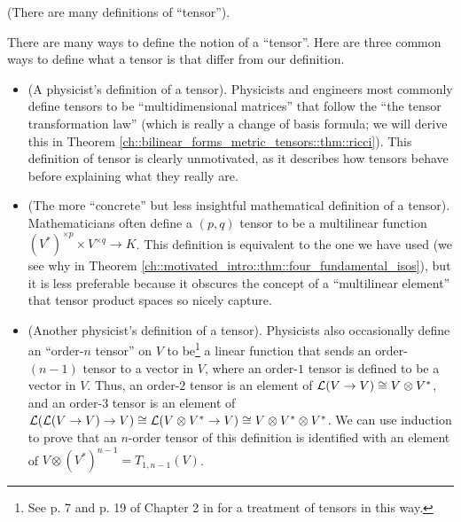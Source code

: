 \begin{remark}
\label{ch::motivated_intro::rmk::many_defs_tensor}
    (There are many definitions of ``tensor'').
    
    There are many ways to define the notion of a ``tensor''. Here are three common ways to define what a tensor is that differ from our definition.
    
    \begin{itemize}
        \item (A physicist's definition of a tensor). Physicists and engineers most commonly define tensors to be ``multidimensional matrices'' that follow the ``the tensor transformation law'' (which is really a change of basis formula; we will derive this in Theorem \ref{ch::bilinear_forms_metric_tensors::thm::ricci}). This definition of tensor is clearly unmotivated, as it describes how tensors behave before explaining what they really are.
        \item (The more ``concrete'' but less insightful mathematical definition of a tensor). Mathematicians often define a $(p, q)$ tensor to be a multilinear function $(V^*)^{\times p} \times V^{\times q} \rightarrow K$. This definition is equivalent to the one we have used (we see why in Theorem \ref{ch::motivated_intro::thm::four_fundamental_isos}), but it is less preferable because it obscures the concept of a ``multilinear element'' that tensor product spaces so nicely capture.
        \item (Another physicist's definition of a tensor). Physicists also occasionally define an ``order-$n$ tensor'' on $V$ to be\footnote{See p. 7 and p. 19 of Chapter 2 in \cite{BonetWood} for a treatment of tensors in this way.} a linear function that sends an order-$(n - 1)$ tensor to a vector in $V$, where an order-$1$ tensor is defined to be a vector in $V$. Thus, an order-$2$ tensor is an element of $\mathcal{L}(V \rightarrow V) \cong V \otimes V^*$, and an order-$3$ tensor is an element of $\mathcal{L}(\mathcal{L}(V \rightarrow V) \rightarrow V) \cong \mathcal{L}(V \otimes V^* \rightarrow V) \cong V \otimes V^* \otimes V^*$. We can use induction to prove that an $n$-order tensor of this definition is identified with an element of $V \otimes (V^{*})^{n - 1} = T_{1, n - 1}(V)$.
    \end{itemize}
\end{remark}